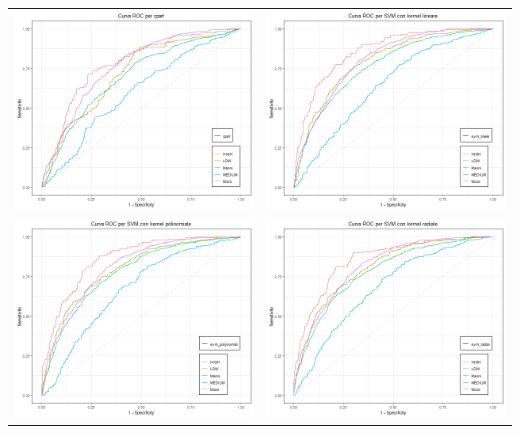     \begin{table}[]
    \begin{tabular}{cc}
    \includegraphics[width=.5\textwidth]{img/roc/roc_rpart.png} &
    \includegraphics[width=.5\textwidth]{img/roc/roc_svml.png} \\
    \includegraphics[width=.5\textwidth]{img/roc/roc_svmp.png} &
    \includegraphics[width=.5\textwidth]{img/roc/roc_smvr.png} \\

\end{tabular}
\end{table}
